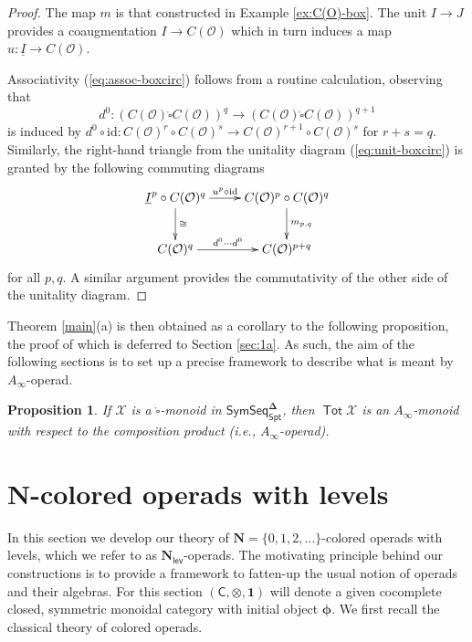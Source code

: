 \documentclass[11pt]{amsart}
\newtheorem{proposition}[subsection]{Proposition}
\theoremstyle{definition}
\theoremstyle{remark}
\newcommand{\Spt}{\mathsf{Spt}}
\newcommand{\Tot}{\operatorname{\mathsf{Tot}}}
\newcommand{\SymSeq}{\mathsf{SymSeq}}
\newcommand{\id}{\mathrm{id}}
\newcommand{\Cal}[1]{\mathcal{#1}}
\newcommand{\boxcirc}{\mathring{\square}}
\newcommand{\Nl}{\mathbf{N}_{\mathsf{lev}}}
\newcommand{\bdel}{\mathbf{\Delta}}
\newcommand{\fco}{C(\Cal{O})}
\newcommand{\ptC}{\pmb{\phi}}
\begin{document}
\begin{proof}
    The map $m$ is that constructed in Example \ref{ex:C(O)-box}. The unit $I\to J$ provides a coaugmentation $I\to C(\Cal{O})$ which in turn induces a map $u\colon \underline{I}\to C(\Cal{O})$. 
    
    Associativity (\ref{eq:assoc-boxcirc}) follows from a routine calculation, observing that \[d^0 \colon (\fco \boxcirc \fco)^{q} \to (\fco \boxcirc \fco)^{q+1}\] is induced by $d^0 \circ \id\colon \fco^r\circ \fco^s\to \fco^{r+1} \circ \fco^s$ for $r+s=q$. Similarly, the right-hand triangle from the unitality diagram (\ref{eq:unit-boxcirc}) is granted by the following commuting diagrams\[ \xymatrix{
        \underline{I}^p \circ C(\Cal{O})^q \ar[r]^-{u^p\circ \id} \ar[d]^-{\cong}
        & 
        C(\Cal{O})^p \circ \fco^q \ar[d]^-{m_{p,q}}
        \\ 
        \fco^q \ar[r]^-{d^0\cdots d^0} 
        & 
        \fco^{p+q}
        }\]
    for all $p,q$. A similar argument provides the commutativity of the other side of the unitality diagram. 
\end{proof}

Theorem \ref{main}(a) is then obtained as a corollary to the following proposition, the proof of which is deferred to Section \ref{sec:1a}. As such, the aim of the following sections is to set up a precise framework to describe what is meant by $A_{\infty}$-operad.

\begin{proposition}  \label{main-1}
    If $\Cal{X}$ is a $\boxcirc$-monoid in $\SymSeq_{\Spt}^{\bdel}$, then $\Tot \Cal{X}$ is an $A_{\infty}$-monoid with respect to the composition product (i.e., $A_{\infty}$-operad). 
\end{proposition}



\section{$\mathbf{N}$-colored operads with levels} \label{sec:N-lev}
In this section we develop our theory of $\mathbf{N}=\{0,1,2,\dots\}$-colored operads with levels, which we refer to as $\Nl$-operads. The motivating principle behind our constructions is to provide a framework to fatten-up the usual notion of operads and their algebras. For this section $(\mathsf{C},\otimes, \mathbf{1})$ will denote a given cocomplete closed, symmetric monoidal category with initial object $\ptC$. We first recall the classical theory of colored operads. 
\end{document}
